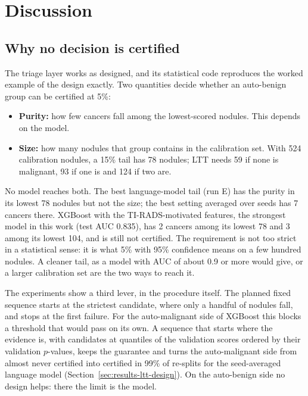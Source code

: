 \chapter{Discussion}
\label{ch:discussion}

\section{Why no decision is certified}
\label{sec:disc-ltt}

The triage layer works as designed, and its statistical code reproduces the worked example of the
design exactly. Two quantities decide whether an auto-benign group can be certified at 5\%:

\begin{itemize}
  \item \textbf{Purity:} how few cancers fall among the lowest-scored nodules. This depends on the
        model.
  \item \textbf{Size:} how many nodules that group contains in the calibration set. With 524
        calibration nodules, a 15\% tail has 78 nodules; LTT needs 59 if none is malignant, 93 if
        one is and 124 if two are.
\end{itemize}

No model reaches both. The best language-model tail (run E) has the purity in its lowest 78
nodules but not the size; the best setting averaged over seeds has 7 cancers there. XGBoost with
the TI-RADS-motivated features, the strongest model in this work (test AUC 0.835), has 2 cancers
among its lowest 78 and 3 among its lowest 104, and is still not certified. The requirement is
not too strict in a statistical sense: it is what 5\% with 95\% confidence means on a few hundred
nodules. A cleaner tail, as a model with AUC of about 0.9 or more would give, or a larger
calibration set are the two ways to reach it.

The experiments show a third lever, in the procedure itself. The planned fixed sequence starts at
the strictest candidate, where only a handful of nodules fall, and stops at the first failure.
For the auto-malignant side of XGBoost this blocks a threshold that would pass on its own. A
sequence that starts where the evidence is, with candidates at quantiles of the validation scores
ordered by their validation $p$-values, keeps the guarantee and turns the auto-malignant side from
almost never certified into certified in 99\% of re-splits for the seed-averaged language model
(Section~\ref{sec:results-ltt-design}). On the auto-benign side no design helps: there the limit
is the model.

